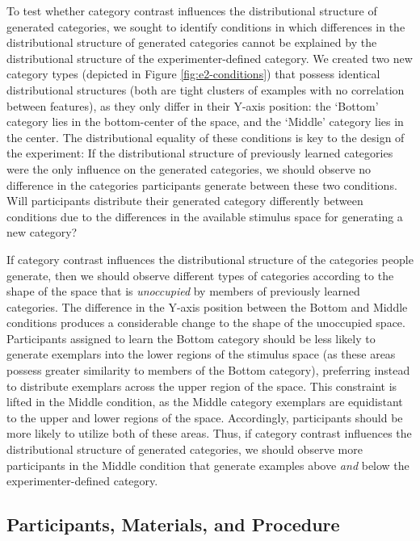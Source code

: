 \documentclass[12pt]{article}
\begin{document}
\begin{flushleft}
To test whether category contrast influences the distributional structure of generated categories, we sought to identify conditions in which differences in the distributional structure of generated categories cannot be explained by the distributional structure of the experimenter-defined category. We created two new category types (depicted in Figure \ref{fig:e2-conditions}) that possess identical distributional structures (both are tight clusters of examples with no correlation between features), as they only differ in their Y-axis position: the `Bottom' category lies in the bottom-center of the space, and the `Middle' category lies in the center. The distributional equality of these conditions is key to the design of the experiment: If the distributional structure of previously learned categories were the only influence on the generated categories, we should observe no difference in the categories participants generate between these two conditions. Will participants distribute their generated category differently between conditions due to the differences in the available stimulus space for generating a new category?

If category contrast influences the distributional structure of the categories people generate, then we should observe different types of categories according to the shape of the space that is {\em unoccupied} by members of previously learned categories. The difference in the Y-axis position between the Bottom and Middle conditions produces a considerable change to the shape of the unoccupied space. Participants assigned to learn the Bottom category should be less likely to generate exemplars into the lower regions of the stimulus space (as these areas possess greater similarity to members of the Bottom category), preferring instead to distribute exemplars across the upper region of the space. This constraint is lifted in the Middle condition, as the Middle category exemplars are equidistant to the upper and lower regions of the space. Accordingly, participants should be more likely to utilize both of these areas. Thus, if category contrast influences the distributional structure of generated categories, we should observe more participants in the Middle condition that generate examples above {\em and} below the experimenter-defined category.


\subsection{Participants, Materials, and Procedure}


\end{flushleft}
\end{document}
